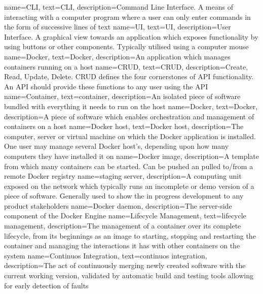 {
    name={CLI},
    text={CLI},
    description={Command Line Interface. A means of interacting with a computer program where a user can only enter commands in the form of successive lines of text}
}
{
    name={UI},
    text={UI},
    description={User Interface. A graphical view towards an application which exposes functionality by using buttons or other components. Typically utilised using a computer mouse}
}
{
    name={Docker},
    text={Docker},
    description={An application which manages containers running on a host}
}
{
    name={CRUD},
    text={CRUD},
    description={Create, Read, Update, Delete. CRUD defines the four cornerstones of API functionality. An API should provide these functions to any user using the API}
}
{
    name={Container},
    text={container},
    description={An isolated piece of software bundled with everything it needs to run on the host}
}
{
		name={Docker},
    text={Docker},
		description={A piece of software which enables orchestration and management of containers on a host}
}
{
		name={Docker host},
    text={Docker host},
		description={The computer, server or virtual machine on which the Docker application is installed. One user may manage several Docker host's, depending upon how many computers they have installed it on}
}
{
		name={Docker image},
		description={A template from which many containers can be started. Can be pushed an pulled to/from a remote Docker registry}
}
{
		name={staging server},
		description={A computing unit exposed on the network which typically runs an incomplete or demo version of a piece of software. Generally used to show the in progress development to any product stakeholders}
}
{
		name={Docker daemon},
		description={The server-side component of the Docker Engine}
}
{
		name={Lifecycle Management},
    text={lifecycle management},
		description={The management of a container over its complete lifecycle, from its beginnings as an image to starting, stopping and restarting the container and managing the interactions it has with other containers on the system}
}
{
		name={Continuos Integration},
    text={continuos integration},
		description={The act of continuously merging newly created software with the current working version, validated by automatic build and testing tools allowing for early detection of faults}
}
